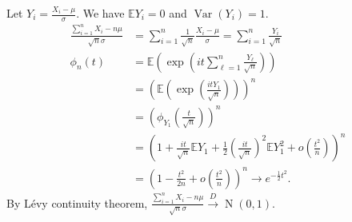 \documentclass{huhtakm-template-book-v2}
\newcommand{\expect}{\mathbb{E}}
\DeclareMathOperator{\N}{N}
\DeclareMathOperator{\Var}{Var}
\begin{document}
    \begin{proofing}
        Let $Y_{i} = \frac{X_{i}-\mu}{\sigma}$. We have $\expect{Y_{i}} = 0$ and $\Var(Y_{i}) = 1$.
        \begin{align*}
            \frac{\sum_{i = 1}^{n}X_{i}-n\mu}{\sqrt{n}\sigma} &= \sum_{i = 1}^{n}\frac{1}{\sqrt{n}}\frac{X_{i}-\mu}{\sigma} = \sum_{i = 1}^{n}\frac{Y_{i}}{\sqrt{n}}\\
            \phi_{n}(t) &= \expect\left(\exp\left(it\sum_{\ell = 1}^{n}\frac{Y_{\ell}}{\sqrt{n}}\right)\right)\\
            &= \left(\expect\left(\exp\left(\frac{itY_{1}}{\sqrt{n}}\right)\right)\right)^{n}\\
            &= \left(\phi_{Y_{1}}\left(\frac{t}{\sqrt{n}}\right)\right)^{n}\\
            \tag{Taylor expansion}
            &= \left(1+\frac{it}{\sqrt{n}}\expect{Y_{1}}+\frac{1}{2}\left(\frac{it}{\sqrt{n}}\right)^{2}\expect{Y_{1}^{2}}+o\left(\frac{t^{2}}{n}\right)\right)^{n}\\
            &= \left(1-\frac{t^{2}}{2n}+o\left(\frac{t^{2}}{n}\right)\right)^{n} \to e^{-\frac{1}{2}t^{2}}.
        \end{align*}
        By L\'evy continuity theorem, $\frac{\sum_{i = 1}^{n}X_{i}-n\mu}{\sqrt{n}\sigma} \xrightarrow{D} \N(0,1)$.
    \end{proofing}
    \newpage
\end{document}
